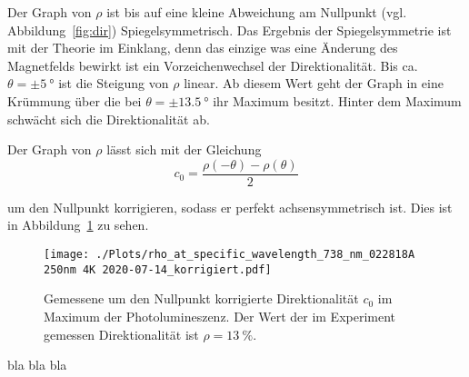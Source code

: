 Der Graph von $\rho$ ist bis auf eine kleine Abweichung am Nullpunkt (vgl. Abbildung~\ref{fig:dir}) 
Spiegelsymmetrisch. 
Das Ergebnis der Spiegelsymmetrie ist mit der Theorie im Einklang, denn das einzige was eine
Änderung des Magnetfelds bewirkt ist ein Vorzeichenwechsel der Direktionalität.
Bis ca. $\theta = \pm \SI{5}{\degree}$ ist die Steigung von $\rho$ linear.
Ab diesem Wert geht der Graph in eine Krümmung über die bei $\theta = \pm \SI{13,5}{\degree}$
ihr Maximum besitzt. 
Hinter dem Maximum schwächt sich die Direktionalität ab.

Der Graph von $\rho$ lässt sich mit der Gleichung 
\begin{equation}
    c_0= \frac{\rho(-\theta)-\rho(\theta)}{2}
    \label{eq:c_0} 
\end{equation}

um den Nullpunkt korrigieren, sodass er perfekt achsensymmetrisch ist.
Dies ist in Abbildung~\ref{fig:dir_kor} zu sehen.
\begin{figure}
    \centering
    \texttt{[image: ./Plots/rho\_at\_specific\_wavelength\_738\_nm\_022818A 250nm 4K 2020-07-14\_korrigiert.pdf]}
    \caption{Gemessene um den Nullpunkt korrigierte Direktionalität $c_0$ im Maximum der Photolumineszenz.
    Der Wert der im Experiment gemessen Direktionalität ist $\rho = \SI{13}{\percent}$.}
    \label{fig:dir_kor}
\end{figure}
\FloatBarrier


bla bla bla